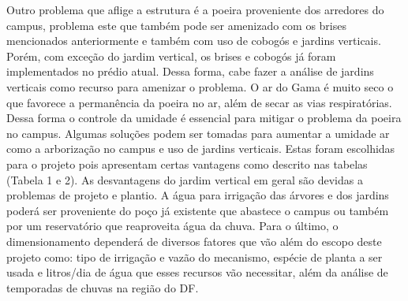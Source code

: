 Outro problema que aflige a estrutura é a poeira proveniente dos arredores do campus, problema este que também pode ser amenizado com os brises mencionados anteriormente e também com uso de cobogós e jardins verticais. Porém, com exceção do jardim vertical, os brises e cobogós já foram implementados no prédio atual. Dessa forma, cabe fazer a análise de jardins verticais como recurso para amenizar o problema.
O ar do Gama é muito seco o que favorece a permanência da poeira no ar, além de secar as vias respiratórias. Dessa forma o controle da umidade é essencial para mitigar o problema da poeira no campus. Algumas soluções podem ser tomadas para aumentar a umidade ar como a arborização no campus e uso de jardins verticais. Estas foram escolhidas para o projeto pois apresentam certas vantagens como descrito nas tabelas (Tabela 1 e 2). As desvantagens do jardim vertical em geral são devidas a problemas de projeto e plantio. A água para irrigação das árvores e dos jardins poderá ser proveniente do poço já existente que abastece o campus ou também por um reservatório que reaproveita água da chuva. Para o último, o dimensionamento dependerá de diversos fatores que vão além do escopo deste projeto como: tipo de irrigação e vazão do mecanismo, espécie de planta a ser usada e litros/dia de água que esses recursos vão necessitar, além da análise de temporadas de chuvas na região do DF.

